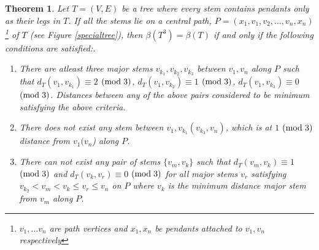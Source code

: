 \documentclass{article}
\newtheorem{thm}{Theorem}[section]
\theoremstyle{definition}
\numberwithin{equation}{section}
\begin{document}
\begin{thm}
Let $T=(V, E)$ be a tree where every stem contains pendants only as their legs in $T$.  If all the stems lie on a central path, $P=(x_{1}, v_{1},v_{2},\hdots,v_{n},x_{n})$
\footnote{$v_{1},\hdots v_{n}$ are path vertices and $x_{1},x_{n}$ be pendants attached to $v_{1},v_{n}$ respectively} of $T$ (see Figure \ref{specialtree}), then $\beta{(T^{3})}=\beta{(T)}$ if and only if the following conditions are satisfied:.

\begin{enumerate}
\item There are atleast three major stems $v_{k_{1}}, v_{k_{2}},v_{k_{3}}$ between $v_{1},v_{n}$ along $P$ such that $d_{T}(v_{1},v_{k_{1}})\equiv 2$ $(\text{mod} \hspace{0.3em} 3)$, $d_{T}(v_{1},v_{k_{2}})\equiv 1$ $(\text{mod} \hspace{0.3em} 3)$, $d_{T}(v_{1},v_{k_{3}})\equiv 0$ $(\text{mod} \hspace{0.3em} 3)$.
Distances between 
any of the above pairs considered to be minimum satisfying the above criteria.


\item There does not exist any stem between $v_{1},v_{k_{1}} (v_{k_{3}}, v_{n})$, which is at $1$ $(\text{mod} \hspace{0.3em} 3)$ distance from $v_{1} (v_{n}$) along $P$. 




\item There can not exist any pair of stems $\{v_{m},v_{k}\}$ such that $d_{T}(v_{m},v_{k})\equiv 1 $ $(\text{mod} \hspace{0.3em} 3)$ and $d_{T}(v_{k},v_{r})\equiv 0$ $(\text{mod} \hspace{0.3em} 3)$ for all major stems $v_{r}$ satisfying $v_{k_{2}}<v_{m}<v_{k}\leq v_{r}\leq v_{n}$  on $P$ where $v_{k}$ is the minimum distance major stem from $v_{m}$ along $P$. 
\end{enumerate}
\end{thm}
\end{document}
